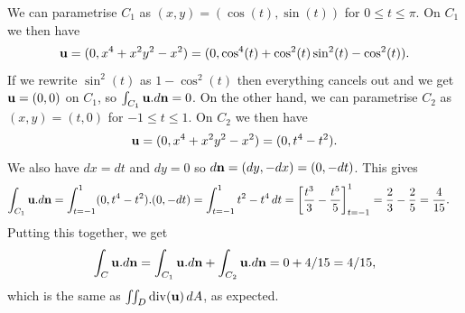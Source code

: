 \documentclass[a4paper]{amsart}
\renewenvironment{solution}{\SolutionInline}{\endSolutionInline}
\begin{document}
\begin{solution}
\begin{center}
 \end{center}
 We can parametrise $C_1$ as $(x,y)=(\cos(t),\sin(t))$ for
 $0\leq t\leq\pi$.  On $C_1$ we then have
 \[ \mathbf{u} = (0,x^4+x^2y^2-x^2) 
        = (0,\cos^4(t)+\cos^2(t)\sin^2(t)-\cos^2(t)).
 \]
 If we rewrite $\sin^2(t)$ as $1-\cos^2(t)$ then everything cancels
 out and we get $\mathbf{u}=(0,0)$ on $C_1$, so $\int_{C_1}\mathbf{u}.d\mathbf{n}=0$.  On
 the other hand, we can parametrise $C_2$ as $(x,y)=(t,0)$ for
 $-1\leq t\leq 1$.  On $C_2$ we then have 
 \[ \mathbf{u} = (0,x^4+x^2y^2-x^2) = (0,t^4-t^2). \]
 We also have $dx=dt$ and $dy=0$ so $d\mathbf{n}=(dy,-dx)=(0,-dt)$.  This
 gives 
 \begin{align*}
  \int_{C_1}\vu.d\vn &= 
   \int_{t=-1}^1 (0,t^4-t^2).(0,-dt) = 
   \int_{t=-1}^1 t^2-t^4\,dt = 
   \CH{\frac{t^3}{3}-\frac{t^5}{5}}_{t=-1}^1 = 
   \frac{2}{3} - \frac{2}{5} = \frac{4}{15}.
 \end{align*}
 Putting this together, we get 
 \[ \int_{C}\mathbf{u}.d\mathbf{n} = \int_{C_1}\mathbf{u}.d\mathbf{n} + \int_{C_2}\mathbf{u}.d\mathbf{n} =
       0 + 4/15 = 4/15,
 \]
 which is the same as $\iint_D\operatorname{div}(\mathbf{u})\,dA$, as expected.
\end{solution}
\end{document}
